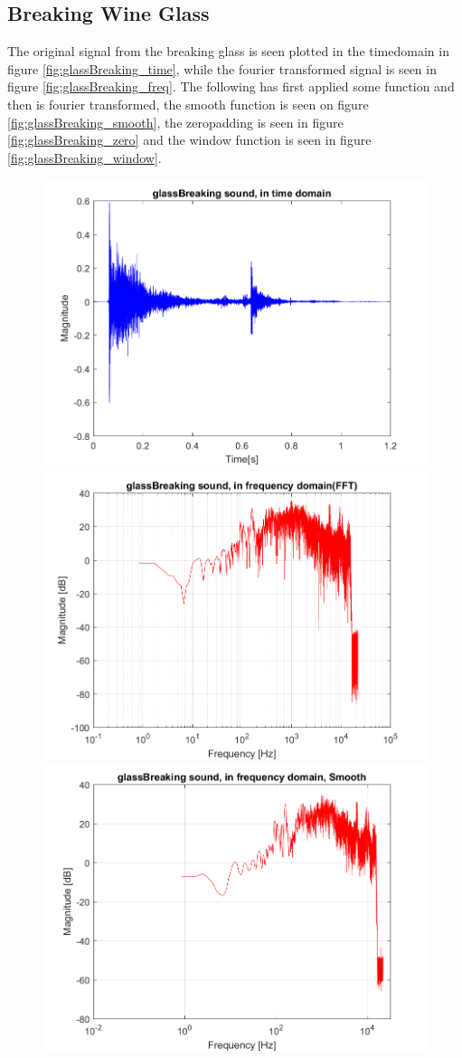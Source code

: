 \subsection{Breaking Wine Glass}

The original signal from the breaking glass is seen plotted in the timedomain in figure \ref{fig:glassBreaking_time}, while the fourier transformed signal is seen in figure \ref{fig:glassBreaking_freq}. The following has first applied some function and then is fourier transformed, the smooth function is seen on figure \ref{fig:glassBreaking_smooth}, the zeropadding is seen in figure \ref{fig:glassBreaking_zero} and the window function is seen in figure \ref{fig:glassBreaking_window}.

\begin{figure}[htb!]
	\centering
	{\includegraphics[width=0.45\linewidth]{code/glassBreaking_figure1.png}}
	{\includegraphics[width=0.45\linewidth]{code/glassBreaking_figure2.png}}
	{\includegraphics[width=0.45\linewidth]{code/glassBreaking_figure3.png}}

\end{figure}
